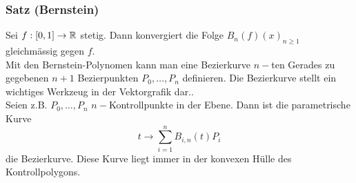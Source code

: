 \subsubsection*{Satz (Bernstein)}
Sei $f:\lbrack 0,1\rbrack\to\mathbb{R}$ stetig. Dann konvergiert die Folge $B_n\left( f\right)(x)_{n\geq 1}$ gleichmässig gegen $f$.\\

Mit den Bernstein-Polynomen kann man eine Bezierkurve $n-$ten Gerades zu gegebenen $n+1$  Bezierpunkten $P_0,\dots,P_n$ definieren. Die Bezierkurve stellt ein wichtiges Werkzeug in der Vektorgrafik dar..\\

Seien z.B. $P_0,\dots,P_n$ $n-$Kontrollpunkte in der Ebene. Dann ist die parametrische Kurve
\[t \to \sum\limits_{i = 1}^n {{B_{i,n}}\left( t \right){P_i}} \]
die Bezierkurve. Diese Kurve liegt immer in der konvexen Hülle des Kontrollpolygons.